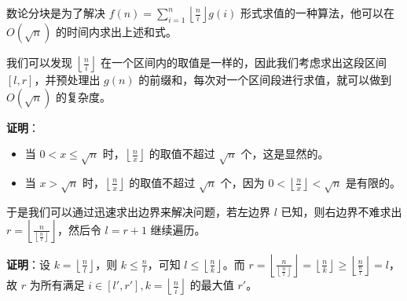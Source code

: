 数论分块是为了解决 $f(n) = \sum\limits_{i = 1}^{n}\left\lfloor\frac{n}{i}\right\rfloor g(i)$ 形式求值的一种算法，他可以在 $O(\sqrt{n})$ 的时间内求出上述和式。

我们可以发现 $\left\lfloor\frac{n}{i}\right\rfloor$ 在一个区间内的取值是一样的，因此我们考虑求出这段区间 $[l, r]$，并预处理出 $g(n)$ 的前缀和，每次对一个区间段进行求值，就可以做到 $O(\sqrt{n})$ 的复杂度。

\textbf{证明}：
\begin{itemize}
    \item 当 $0 < x \le \sqrt{n}$ 时，$\left\lfloor\frac{n}{x}\right\rfloor$ 的取值不超过 $\sqrt{n}$ 个，这是显然的。
    \item 当 $x > \sqrt{n}$ 时，$\left\lfloor\frac{n}{x}\right\rfloor$ 的取值不超过 $\sqrt{n}$ 个，因为 $0 < \left\lfloor\frac{n}{x}\right\rfloor < \sqrt{n}$ 是有限的。
\end{itemize}

于是我们可以通过迅速求出边界来解决问题，若左边界 $l$ 已知，则右边界不难求出 $r = \left\lfloor\frac{n}{\left\lfloor\frac{n}{l}\right\rfloor}\right\rfloor$，然后令 $l = r + 1$ 继续遍历。

\textbf{证明}：设 $k = \left\lfloor\frac{n}{l}\right\rfloor$，则 $k \le \frac{n}{l}$，可知 $l \le \left\lfloor\frac{n}{k}\right\rfloor$。而 $r = \left\lfloor\frac{n}{\left\lfloor\frac{n}{l}\right\rfloor}\right\rfloor = \left\lfloor\frac{n}{k}\right\rfloor \ge \left\lfloor\frac{n}{\frac{n}{l}}\right\rfloor = l$，故 $r$ 为所有满足 $i \in [l', r'], k = \left\lfloor\frac{n}{i}\right\rfloor$ 的最大值 $r'$。
